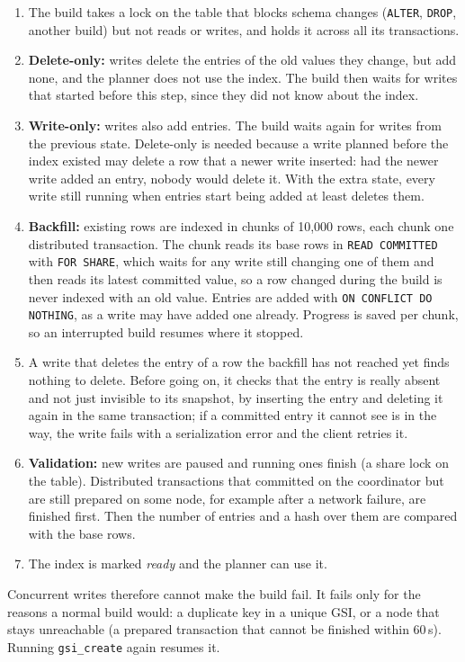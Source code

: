 \documentclass[11pt,a4paper]{article}
\begin{document}
\begin{enumerate}
  \item The build takes a lock on the table that blocks schema changes (\texttt{ALTER}, \texttt{DROP},
        another build) but not reads or writes, and holds it across all its transactions.
  \item \textbf{Delete-only:} writes delete the entries of the old values they change, but add none,
        and the planner does not use the index. The build then waits for writes that started before
        this step, since they did not know about the index.
  \item \textbf{Write-only:} writes also add entries. The build waits again for writes from the
        previous state. Delete-only is needed because a write planned before the index existed may
        delete a row that a newer write inserted: had the newer write added an entry, nobody would
        delete it. With the extra state, every write still running when entries start being added at
        least deletes them.
  \item \textbf{Backfill:} existing rows are indexed in chunks of 10,000 rows, each chunk one
        distributed transaction. The chunk reads its base rows in \texttt{READ COMMITTED} with
        \texttt{FOR SHARE}, which waits for any write still changing one of them and then reads its
        latest committed value, so a row changed during the build is never indexed with an old value.
        Entries are added with \texttt{ON CONFLICT DO NOTHING}, as a write may have added one already.
        Progress is saved per chunk, so an interrupted build resumes where it stopped.
  \item A write that deletes the entry of a row the backfill has not reached yet finds nothing to
        delete. Before going on, it checks that the entry is really absent and not just invisible to its
        snapshot, by inserting the entry and deleting it again in the same transaction; if a committed
        entry it cannot see is in the way, the write fails with a serialization error and the client
        retries it.
  \item \textbf{Validation:} new writes are paused and running ones finish (a share lock on the table).
        Distributed transactions that committed on the coordinator but are still prepared on some node,
        for example after a network failure, are finished first. Then the number of entries and a hash
        over them are compared with the base rows.
  \item The index is marked \emph{ready} and the planner can use it.
\end{enumerate}
Concurrent writes therefore cannot make the build fail. It fails only for the reasons a normal build
would: a duplicate key in a unique GSI, or a node that stays unreachable (a prepared transaction that
cannot be finished within 60\,s). Running \texttt{gsi\_create} again resumes it.
\end{document}
